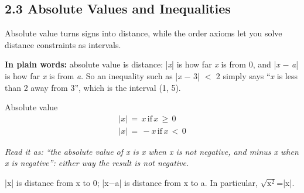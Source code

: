 \documentclass[11pt]{article}
\begin{document}
\begin{keepsection}
\section{2.3 Absolute Values and Inequalities}

Absolute value turns signs into distance, while the order axioms let you solve distance constraints as intervals.

\begin{plainbox}\textbf{In plain words:} absolute value is distance: |\textit{x}| is how far \textit{x} is from 0, and |\textit{x} \ensuremath{-} \textit{a}| is how far \textit{x} is from \textit{a}. So an inequality such as |\textit{x} \ensuremath{-} 3| \ensuremath{<} 2 simply says “\textit{x} is less than 2 away from 3”, which is the interval (1, 5).\end{plainbox}

\begin{equationcard}{Absolute value}
\[ \begin{gathered} |{x}|\, =\, {x}\, \text{if}\, {x}\, \geq \, 0 \\ |{x}|\, =\, -{x}\, \text{if}\, {x}\, <\, 0 \end{gathered} \]
{\small \emph{Read it as: “the absolute value of x is x when x is not negative, and minus x when x is negative”: either way the result is not negative.}\par |x| is distance from x to 0; |x\ensuremath{-}a| is distance from x to a. In particular, \ensuremath{\sqrt{\mathrm{x}^{2}}}=|x|.}
\end{equationcard}


\end{keepsection}
\end{document}
